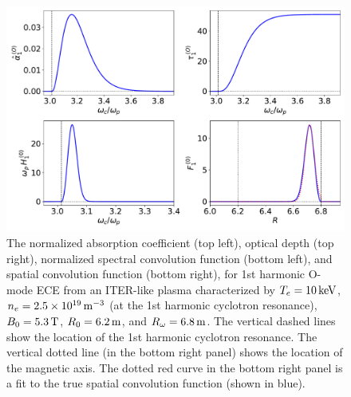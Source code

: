 \documentclass{iopjournal}
\begin{document}
{\begin{figure}
\centerline{\includegraphics[width=\textwidth]{Fig21.pdf}}
\caption{The normalized  absorption coefficient (top left), optical depth (top right), normalized
spectral convolution function (bottom left), and spatial convolution function (bottom right), for 1st harmonic O-mode ECE from an
ITER-like plasma characterized by  $T_e=10\,{\rm keV}$, $n_e=2.5\times 10^{19}\,{\rm m}^{-3}$ (at the 1st harmonic cyclotron resonance), $B_0=5.3\,{\rm T}$, $R_0=6.2\,{\rm m}$, and $R_\omega= 6.8\,{\rm m}$.
The vertical dashed lines show the location of the 1st harmonic cyclotron resonance.  The vertical dotted line (in the bottom right panel) shows the location of the  magnetic axis. 
The dotted red curve in the bottom right panel is a  fit to the true spatial convolution function (shown in blue).\label{Omode}}
\end{figure}

}
\end{document}
